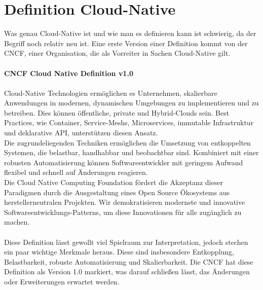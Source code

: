 \section{Definition Cloud-Native}
Was genau Cloud-Native ist und wie man es definieren kann ist schwierig, da der Begriff noch relativ neu ist. Eine erste Version einer Definition kommt von der \ac{CNCF}, einer Organisation, die als Vorreiter in Sachen Cloud-Native gilt.\\
\\
\textbf{CNCF Cloud Native Definition v1.0}\\
\\
\glqq Cloud-Native Technologien ermöglichen es Unternehmen, skalierbare Anwendungen in modernen, dynamischen Umgebungen zu implementieren und zu betreiben. Dies können öffentliche, private und Hybrid-Clouds sein. Best Practices, wie Container, Service-Meshs, Microservices, immutable Infrastruktur und deklarative \ac{API}, unterstützen diesen Ansatz.
\\
Die zugrundeliegenden Techniken ermöglichen die Umsetzung von entkoppelten Systemen, die belastbar, handhabbar und beobachtbar sind. Kombiniert mit einer robusten Automatisierung können Softwareentwickler mit geringem Aufwand flexibel und schnell auf Änderungen reagieren.
\\
Die Cloud Native Computing Foundation fördert die Akzeptanz dieser Paradigmen durch die Ausgestaltung eines Open Source Ökosystems aus herstellerneutralen Projekten. Wir demokratisieren modernste und innovative Softwareentwicklungs-Patterns, um diese Innovationen für alle zugänglich zu machen.\grqq{} \cite{CNCF}\\
\\
Diese Definition lässt gewollt viel Spielraum zur Interpretation, jedoch stechen ein paar wichtige Merkmale heraus. Diese sind insbesondere Entkopplung, Belastbarkeit, robuste Automatisierung und Skalierbarkeit. Die CNCF hat diese Definition als Version 1.0 markiert, was darauf schließen lässt, das Änderungen oder Erweiterungen erwartet werden.

